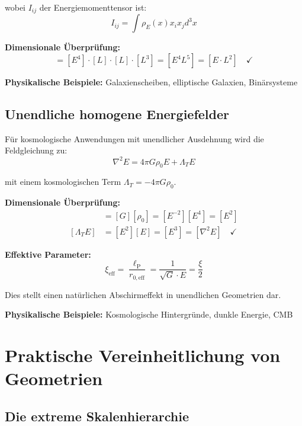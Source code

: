 \documentclass[12pt,a4paper]{report}
\newcommand{\lP}{\ell_{\text{P}}}         %
\begin{document}
	wobei $I_{ij}$ der Energiemomenttensor ist:
	\begin{equation}
		I_{ij} = \int \rho_E(x) x_i x_j d^3x
	\end{equation}
	
	\textbf{Dimensionale Überprüfung:}
	\begin{equation}
		[I_{ij}] = [E^4] \cdot [L] \cdot [L] \cdot [L^3] = [E^4 L^5] = [E \cdot L^2] \quad \checkmark
	\end{equation}
	
	\textbf{Physikalische Beispiele:} Galaxienscheiben, elliptische Galaxien, Binärsysteme
	
	\subsection{Unendliche homogene Energiefelder}
	\label{subsec:infinite_homogeneous}
	
	Für kosmologische Anwendungen mit unendlicher Ausdehnung wird die Feldgleichung zu:
	\begin{equation}
		\nabla^2 E = 4\pi G \rho_0 E + \Lambda_T E
	\end{equation}
	
	mit einem kosmologischen Term $\Lambda_T = -4\pi G \rho_0$.
	
	\textbf{Dimensionale Überprüfung:}
	\begin{align}
		[\Lambda_T] &= [G][\rho_0] = [E^{-2}][E^4] = [E^2] \\
		[\Lambda_T E] &= [E^2][E] = [E^3] = [\nabla^2 E] \quad \checkmark
	\end{align}
	
	\textbf{Effektive Parameter:}
	\begin{equation}
		\xi_{\text{eff}} = \frac{\lP}{r_{0,\text{eff}}} = \frac{1}{\sqrt{G} \cdot E} = \frac{\xi}{2}
	\end{equation}
	
	Dies stellt einen natürlichen Abschirmeffekt in unendlichen Geometrien dar.
	
	\textbf{Physikalische Beispiele:} Kosmologische Hintergründe, dunkle Energie, CMB
	
	\section{Praktische Vereinheitlichung von Geometrien}
	\label{sec:practical_unification}
	
	\subsection{Die extreme Skalenhierarchie}
	\label{subsec:extreme_scale_hierarchy}
	
\end{document}
